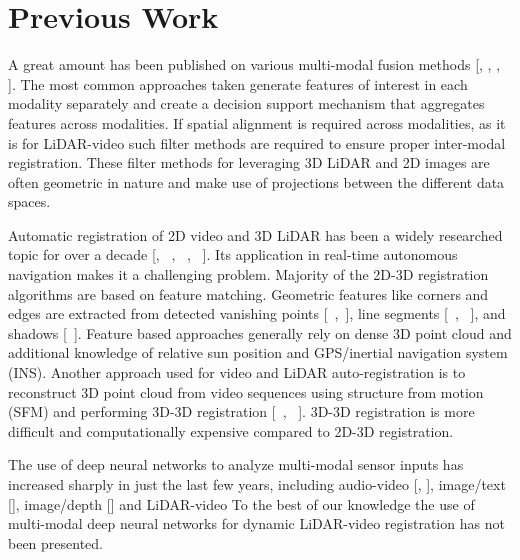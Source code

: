 \documentclass{article}
\begin{document}

\section{Previous Work} %
\label{sec:previous_work}


A great amount has been published on various multi-modal fusion methods [\cite{Ross2003Informatio}, \cite{Gregor2011Learning-R}, \cite{Wu2004Optimal-Mu}, \cite{Snoek2006The-Challe}]. The most common approaches taken generate features of interest in each modality separately and create a decision support mechanism that aggregates features across modalities. If spatial alignment is required across modalities, as it is for LiDAR-video such filter methods \cite{Thrun2011Googles-dr} are required to ensure proper inter-modal registration. These filter methods for leveraging 3D LiDAR and 2D images are often geometric in nature and make use of projections between the different data spaces. 

Automatic registration of 2D video and 3D LiDAR has been a widely researched topic for over a decade [\cite{ Wang2009A-Robust-A}, ~\cite{Kim2014Automatic-}, ~\cite{Mastin2009Automatic-}, ~\cite{Bodensteiner2012Real-time-}]. Its application in real-time autonomous navigation makes it a challenging problem. Majority of the 2D-3D registration algorithms are based on feature matching. Geometric features like corners and edges are extracted from detected vanishing points [~\cite{Liu2007-Vanishing-points},~\cite{Ding2008-Vanishing-point}], line segments [~\cite{Frueh2004-Linesegment}, ~\cite{Stamos2008-Linesegment}], and shadows [~\cite{Troccoli2004-ashadow}]. Feature based approaches generally rely on dense 3D point cloud and additional knowledge of relative sun position and GPS/inertial navigation system (INS). Another approach used for video and LiDAR auto-registration is to reconstruct 3D point cloud from video sequences using structure from motion (SFM) and performing 3D-3D registration [~\cite{Zhao2004-alignment-3Dcloud}, ~\cite{Liu2006-alignment-sfm}]. 3D-3D registration is more difficult and computationally expensive compared to 2D-3D registration. 

The use of deep neural networks to analyze multi-modal sensor inputs  has increased sharply in just the last few years, including audio-video [\cite{Ngiam2011Multimodal}, \cite{Kim2013Deep-Learn}], image/text [\cite{Srivastava2012Multimodal}], image/depth [\cite{Lenz2013Deep-Learn}] and LiDAR-video To the best of our knowledge the use of multi-modal deep neural networks for dynamic LiDAR-video registration has not been presented.
\end{document}
